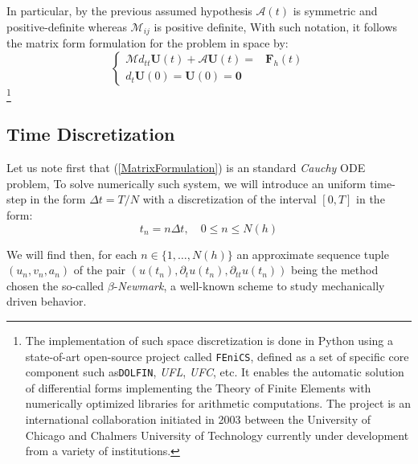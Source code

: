 In particular, by the previous assumed hypothesis $\mathcal{A}(t)$ is symmetric and positive-definite whereas $\mathcal{M}_{ij}$ is positive definite,
With such notation, it follows the matrix form formulation for the problem in space by:
\begin{equation}
    \label{MatrixFormulation}
    \left \{
    \begin{array}{cc}
        \mathcal{M} d_{tt} \mathbf{U}(t) + \mathcal{A} \mathbf{U}(t) = & \mathbf{F}_h (t)  \\
        d_{t} \mathbf{U}(0) = \mathbf{U}(0)  = \mathbf{0}&
    \end{array}
    \right.
\end{equation}
\footnote{The implementation of such space discretization is done in Python using a state-of-art open-source project called \texttt{FEniCS}, defined as a set of specific core component such as\texttt{DOLFIN}, \textit{UFL},  \textit{UFC}, etc. It enables the automatic solution of differential forms implementing the Theory of Finite Elements with numerically optimized libraries for arithmetic computations. The project is an international collaboration initiated in 2003 between the University of Chicago and Chalmers University of Technology currently under development from a variety of institutions.}

\subsection{Time Discretization}
Let us note first that (\ref{MatrixFormulation}) is an standard \textit{Cauchy} ODE problem, To solve numerically such system, we will introduce an uniform time-step in the form $\Delta t = T/N$ with a discretization of the interval $[0, T]$ in the form:
\begin{equation*}
    t_n = n \Delta t, \quad 0 \leq n \leq N(h)
\end{equation*}

We will find then, for each $n \in \{1,\dots, N(h) \}$ an approximate sequence tuple $(u_n, v_n, a_n)$ of the pair $(u(t_n), \partial_{t} u(t_n), \partial_{tt} u(t_n))$ being the method chosen the so-called $\beta$-\textit{Newmark}, a well-known scheme to study mechanically driven behavior. 

